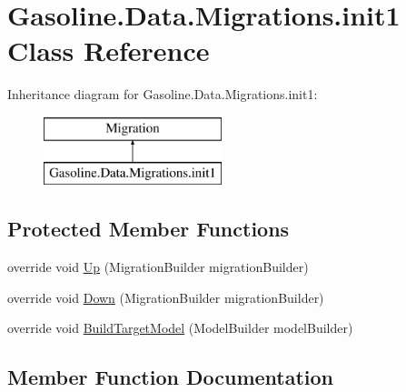 \hypertarget{class_gasoline_1_1_data_1_1_migrations_1_1init1}{}\section{Gasoline.\+Data.\+Migrations.\+init1 Class Reference}
\label{class_gasoline_1_1_data_1_1_migrations_1_1init1}
Inheritance diagram for Gasoline.\+Data.\+Migrations.\+init1\+:\begin{figure}[H]
\begin{center}
\leavevmode
\includegraphics[height=2.000000cm]{class_gasoline_1_1_data_1_1_migrations_1_1init1}
\end{center}
\end{figure}
\subsection*{Protected Member Functions}
\begin{DoxyCompactItemize}
\item 
override void \mbox{\hyperlink{class_gasoline_1_1_data_1_1_migrations_1_1init1_a8f728b84f0566a2eaedc038620db0909}{Up}} (Migration\+Builder migration\+Builder)
\item 
override void \mbox{\hyperlink{class_gasoline_1_1_data_1_1_migrations_1_1init1_aa03798c02b939526f786d1edc9148dfa}{Down}} (Migration\+Builder migration\+Builder)
\item 
override void \mbox{\hyperlink{class_gasoline_1_1_data_1_1_migrations_1_1init1_a408783b9d87a90cfa209509f17177e67}{Build\+Target\+Model}} (Model\+Builder model\+Builder)
\end{DoxyCompactItemize}


\subsection{Member Function Documentation}
\mbox{\label{class_gasoline_1_1_data_1_1_migrations_1_1init1_a408783b9d87a90cfa209509f17177e67}} 
